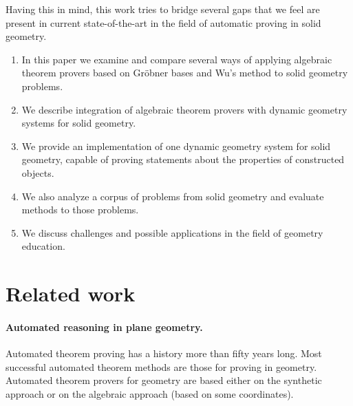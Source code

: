\documentclass[final,1p,times,authoryear]{elsarticle}
\begin{document}
Having this in mind, this work tries to bridge several gaps that we
feel are present in current state-of-the-art in the field of automatic
proving in solid geometry.
\begin{enumerate}
\item In this paper we examine and compare several ways of applying
  algebraic theorem provers based on Gr\"obner bases and Wu's method
  to solid geometry problems.

\item We describe integration of algebraic theorem provers with
  dynamic geometry systems for solid geometry.

\item We provide an implementation of one dynamic geometry system for
  solid geometry, capable of proving statements about the properties
  of constructed objects.

\item We also analyze a corpus of problems from solid geometry and
  evaluate methods to those problems.

\item We discuss challenges and possible applications in the field of
  geometry education.
\end{enumerate}


\section{Related work}
\paragraph{Automated reasoning in plane geometry.}
Automated theorem proving has a history more than fifty years
long. Most successful automated theorem methods are those for proving
in geometry. Automated theorem provers for geometry are based either
on the synthetic approach or on the algebraic approach (based on some
coordinates).
\end{document}

